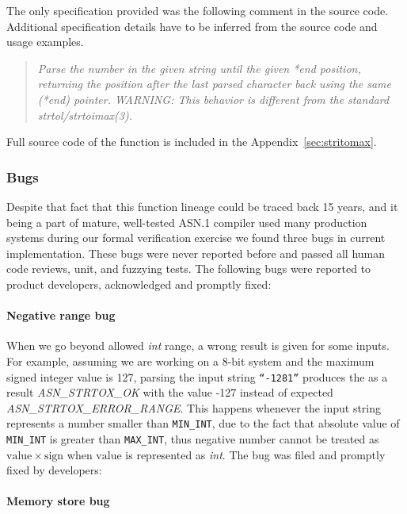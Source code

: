 \documentclass[acmsmall,nonacm]{acmart}
\begin{document}
The only specification provided was the following comment in the
source code. Additional specification details have to be inferred from
the source code and usage examples.

\begin{quote}
 { \it Parse the number in the given string until the given *end position,
 returning the position after the last parsed character back using the
 same (*end) pointer.
 WARNING: This behavior is different from the standard strtol/strtoimax(3). }
\end{quote}

Full source code of the function is included in the Appendix~\ref{sec:stritomax}.

\subsubsection{Bugs}

Despite that fact that this function lineage could be traced back 15
years, and it being a part of mature, well-tested ASN.1 compiler used
many production systems during our formal verification exercise we
found three bugs in current implementation. These bugs were never
reported before and passed all human code reviews, unit, and fuzzying
tests. The following bugs were reported to product developers,
acknowledged and promptly fixed:
  
\paragraph{Negative range bug}

When we go beyond allowed \textit{int} range, a wrong result is given
for some inputs. For example, assuming we are working on a 8-bit
system and the maximum signed integer value is 127, parsing the input
string \texttt{``-1281''} produces the as a result
\emph{ASN\_STRTOX\_OK} with the value -127 instead of expected
\emph{ASN\_STRTOX\_ERROR\_RANGE}. This happens whenever the input
string represents a number smaller than \texttt{MIN\_INT}, due to the
fact that absolute value of \texttt{MIN\_INT} is greater than
\texttt{MAX\_INT}, thus negative number cannot be treated as
$\mathrm{value}\times\mathrm{sign}$ when $\mathrm{value}$ is
represented as \textit{int}. The bug was filed and promptly fixed by
developers:

\paragraph{Memory store bug}
\end{document}
